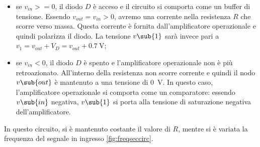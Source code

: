 \begin{itemize}
	\item se $v_{in}>=0$, il diodo $D$ è acceso e il circuito si comporta come un buffer di tensione. Essendo $v_{out}=v_{in}>0$, avremo una corrente nella resistenza $R$ che scorre verso massa. Questa corrente è fornita dall'amplificatore operazionale e quindi polarizza il diodo. La tensione $v\sub{1}$ sarà invece pari a $v_1=v_{out}+V_D=v_{out}+\SI{0.7}{\volt}$;
	\item se $v_{in}<0$, il diodo $D$ è spento e l'amplificatore operazionale non è più retroazionato. All'interno della resistenza non scorre corrente e quindi il nodo $v\sub{out}$ è mantenuto a una tensione di \SI{0}{\volt}. In questo caso, l'amplificatore operazionale si comporta come un comparatore: essendo $v\sub{in}$ negativa, $v\sub{1}$ si porta alla tensione di saturazione negativa dell'amplificatore.
\end{itemize}
In questo circuito, si è mantenuto costante il valore di $R$, mentre si è variata la frequenza del segnale in ingresso \ref{fig:freqseccirc}.

